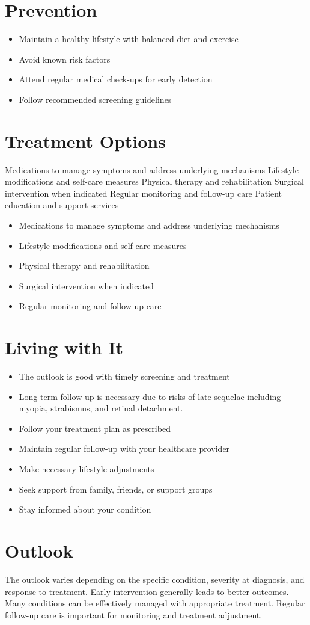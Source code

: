 \section{Prevention}
\begin{itemize}[noitemsep]
  \item Maintain a healthy lifestyle with balanced diet and exercise
  \item Avoid known risk factors
  \item Attend regular medical check-ups for early detection
  \item Follow recommended screening guidelines
\end{itemize}
\section{Treatment Options}
Medications to manage symptoms and address underlying mechanisms Lifestyle modifications and self-care measures Physical therapy and rehabilitation Surgical intervention when indicated Regular monitoring and follow-up care Patient education and support services

\begin{itemize}[noitemsep]
  \item Medications to manage symptoms and address underlying mechanisms
  \item Lifestyle modifications and self-care measures
  \item Physical therapy and rehabilitation
  \item Surgical intervention when indicated
  \item Regular monitoring and follow-up care
\end{itemize}
\section{Living with It}
\begin{itemize}[noitemsep]
  \item The outlook is good with timely screening and treatment
  \item Long-term follow-up is necessary due to risks of late sequelae including myopia, strabismus, and retinal detachment.
  \item Follow your treatment plan as prescribed
  \item Maintain regular follow-up with your healthcare provider
  \item Make necessary lifestyle adjustments
  \item Seek support from family, friends, or support groups
  \item Stay informed about your condition
\end{itemize}
\section{Outlook}
The outlook varies depending on the specific condition, severity at diagnosis, and response to treatment. Early intervention generally leads to better outcomes. Many conditions can be effectively managed with appropriate treatment. Regular follow-up care is important for monitoring and treatment adjustment.
